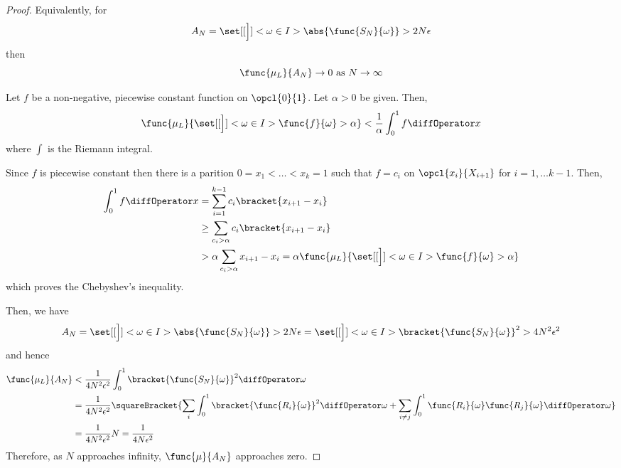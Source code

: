 \begin{proof}
    Equivalently, for 
    \begin{equation*} 
        A_N = \set[[\Big]]<\omega \in I>{\abs{\func{S_N}{\omega}} > 2N \epsilon}
    \end{equation*}
    then
    \begin{equation*}
        \func{\mu_L}{A_N} \to 0  \ \mathrm{as} \ N \to \infty
    \end{equation*}
    \begin{lemma}
        Let \(f\) be a non-negative, piecewise constant function on \(\opcl{0}{1}\). Let \(\alpha > 0\) be given. Then, 
        \begin{equation*}
            \func{\mu_L}{\set[[\Big]]<\omega \in I>{\func{f}{\omega} > \alpha}} < \dfrac{1}{\alpha} \int_{0}^1 f \diffOperator x
        \end{equation*}
        where \(\int\) is the Riemann integral.
    \end{lemma}
    \begin{prooflemma}
        Since \(f\) is piecewise constant then there is a parition \(0 = x_1 < \dots < x_k = 1\) such that \(f = c_i\) on \(\opcl{x_i}{X_{i+1}}\) for \(i= 1, \dots k - 1\). Then, 
        \begin{align*}
            \int_{0}^1 f \diffOperator x &= \sum_{i = 1}^{k-1} c_i \bracket{x_{i+1} - x_i} \\
            &\geq  \sum_{c_i > \alpha} c_i \bracket{x_{i+1} - x_i} \\
            &> \alpha  \sum_{c_i > \alpha}  x_{i+1} - x_i = \alpha \func{\mu_L}{\set[[\Big]]<\omega \in I>{\func{f}{\omega} > \alpha}}
        \end{align*}
        which proves the Chebyshev's inequality.
    \end{prooflemma}
    Then, we have 
    \begin{equation*}
        A_N = \set[[\Big]]<\omega \in I>{\abs{\func{S_N}{\omega}} > 2N \epsilon}= \set[[\Big]]<\omega \in I>{\bracket{\func{S_N}{\omega}}^2 > 4N^2 \epsilon^2}
    \end{equation*}
    and hence 
    \begin{align*}
        \func{\mu_L}{A_N} &< \dfrac{1}{4N^2\epsilon^2} \int_0^1 \bracket{\func{S_N}{\omega}}^2 \diffOperator \omega\\
        &= \dfrac{1}{4N^2\epsilon^2} \squareBracket{\sum_i \int_0^1 \bracket{\func{R_i}{\omega}}^2 \diffOperator \omega + \sum_{i\neq j} \int_0^1 \func{R_i}{\omega}\func{R_j}{\omega} \diffOperator \omega }\\
        &= \dfrac{1}{4N^2\epsilon^2} N = \dfrac{1}{4N \epsilon^2}
    \end{align*}
    Therefore, as \(N\) approaches infinity, \(\func{\mu}{A_N}\) approaches zero.
\end{proof}

